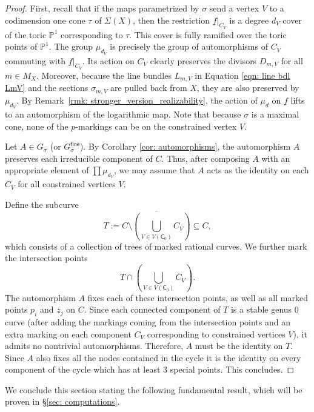 \documentclass{article}
\newcommand{\fine}{\mathsf{fine}}
\begin{document}
\begin{proof}
    First, recall that if the maps parametrized by $\sigma$ send a vertex $V$ to a codimension one cone $\tau$ of $\Sigma(X)$, then the restriction $\underline{f}|_{C_{V}}$ is a degree $d_V$ cover of the toric $\mathbb{P}^1$ corresponding to $\tau$. This cover is fully ramified over the toric points of $\mathbb{P}^1$.
    The group $\mu_{d_V}$ is precisely the group of automorphisms of $C_V$ commuting with $\underline{f}|_{C_{V}}$.
    Its action on $C_V$ clearly preserves the divisors $D_{m,V}$ for all $m \in M_X$. Moreover, because the line bundles $L_{m,V}$ in Equation \eqref{eqn: line bdl LmV} and the sections $\sigma_{m,V}$ are pulled back from $X$, they are also preserved by $\mu_{d_V}$. By Remark~\ref{rmk: stronger_version_realizability}, the action of $\mu_d$ on $\underline{f}$ lifts to an automorphism of the logarithmic map. Note that because $\sigma$ is a maximal cone, none of the $p$-markings can be on the constrained vertex $V$. 

    Let $A \in G_\sigma$ (or $G_\sigma^\fine$).
    By Corollary \ref{cor: automorphisms}, the automorphism $A$ preserves each irreducible component of $C$. Thus, after composing $A$ with an appropriate element of $\prod \mu_{d_V}$, we may assume that $A$ acts as the identity on each $C_V$ for all constrained vertices $V$.

    Define the subcurve
\[
T := \overline{C \setminus \left( \bigcup_{V \in V(\mathsf{C}_0)} C_V \right)} \subseteq C,
\]
which consists of a collection of trees of marked rational curves. We further mark the intersection points
\[
T \cap \left( \bigcup_{V \in V(\mathsf{C}_0)} C_V \right).
\]
The automorphism $A$ fixes each of these intersection points, as well as all marked points $p_i$ and $z_j$ on $C$. Since each connected component of $T$ is a stable genus $0$ curve (after adding the markings coming from the intersection points and an extra marking on each component $C_V$ corresponding to constrained vertices $V$), it admits no nontrivial automorphisms. Therefore, $A$ must be the identity on $T$. Since $A$ also fixes all the nodes contained in the cycle it is the identity on every component of the cycle which has at least $3$ special points. This concludes.
\end{proof}



We conclude this section stating the following fundamental result, which will be proven in \S\ref{sec: computations}.
\end{document}
